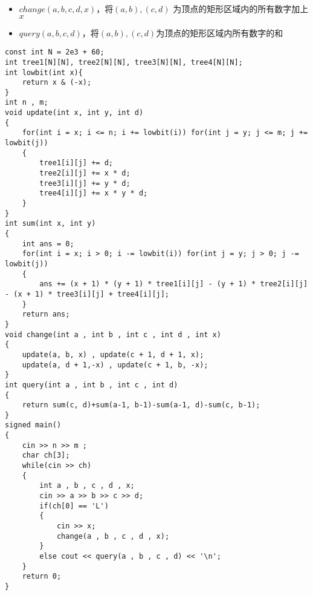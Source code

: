\documentclass[E:/GsjzTle/main/main.tex]{subfiles}
\begin{document}
\begin{itemize}
\item
  \(change(a,b,c,d,x)\)，将\((a,b),(c,d)\)
  为顶点的矩形区域内的所有数字加上 \(x\)
\item
  \(query(a,b,c,d)\)，将\((a,b),(c,d)\)为顶点的矩形区域内所有数字的和
\end{itemize}

\begin{lstlisting}
const int N = 2e3 + 60;
int tree1[N][N], tree2[N][N], tree3[N][N], tree4[N][N];
int lowbit(int x){
	return x & (-x);
}
int n , m;
void update(int x, int y, int d)
{
	for(int i = x; i <= n; i += lowbit(i)) for(int j = y; j <= m; j += lowbit(j))
	{
		tree1[i][j] += d;
		tree2[i][j] += x * d;
		tree3[i][j] += y * d;
		tree4[i][j] += x * y * d;
	}
}
int sum(int x, int y)
{
	int ans = 0;
	for(int i = x; i > 0; i -= lowbit(i)) for(int j = y; j > 0; j -= lowbit(j)) 
	{ 
		ans += (x + 1) * (y + 1) * tree1[i][j] - (y + 1) * tree2[i][j] - (x + 1) * tree3[i][j] + tree4[i][j];
	} 
	return ans;
}
void change(int a , int b , int c , int d , int x)
{
	update(a, b, x) , update(c + 1, d + 1, x);
	update(a, d + 1,-x) , update(c + 1, b, -x);
}
int query(int a , int b , int c , int d)
{
	return sum(c, d)+sum(a-1, b-1)-sum(a-1, d)-sum(c, b-1);
}
signed main()
{
	cin >> n >> m ; 
	char ch[3];
	while(cin >> ch)
	{
		int a , b , c , d , x;
		cin >> a >> b >> c >> d;
		if(ch[0] == 'L')
		{
			cin >> x;
			change(a , b , c , d , x);
		}
		else cout << query(a , b , c , d) << '\n';
	}
	return 0;
}
\end{lstlisting}
\end{document}
